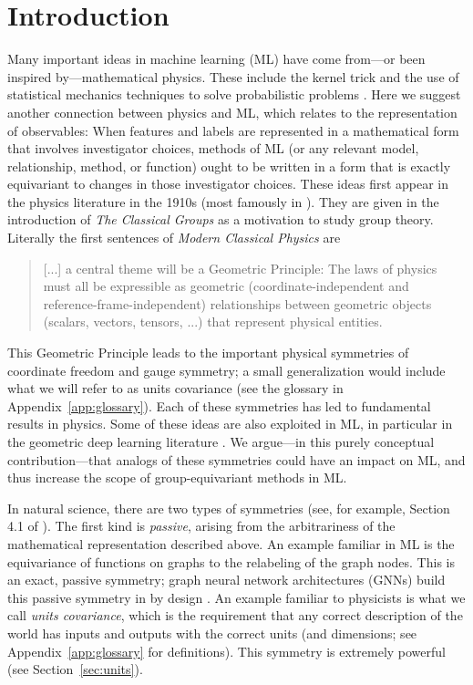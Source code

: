 \documentclass[]{article} %
\newcommand{\sectionname}{Section}
\newcommand{\secref}[1]{\sectionname~\ref{#1}}
\newcommand{\appref}[1]{Appendix~\ref{#1}}
\begin{document}
\section{Introduction}\label{sec:intro}
Many important ideas in machine learning (ML) have come from---or been inspired by---mathematical physics.
These include the kernel trick \citep{CouHil53,SchSmo02} and the use of statistical mechanics techniques to solve probabilistic problems \citep{mcmc, gibbs}.
Here we suggest another connection between physics and ML, which relates to the representation of observables:
When features and labels are represented in a mathematical form that involves investigator choices, methods of ML (or any relevant model, relationship, method, or function) ought to be written in a form that is exactly equivariant to changes in those investigator choices.
These ideas first appear in the physics literature in the 1910s (most famously in \citealt{gr}). They are given in the introduction of \textit{The Classical Groups} \citep{weyl} as a motivation to study group theory.
Literally the first sentences of \textit{Modern Classical Physics} \citep{mcp} are
\begin{quote}
[...] a central theme will be a Geometric Principle: 
The laws of physics must all
be expressible as geometric (coordinate-independent and reference-frame-independent)
relationships between geometric objects (scalars, vectors, tensors, ...) that represent
physical entities.
\end{quote}
This Geometric Principle leads to the important physical symmetries of coordinate freedom and gauge symmetry; a small generalization would include what we will refer to as units covariance (see the glossary in \appref{app:glossary}).
Each of these symmetries has led to fundamental results in physics. Some of these ideas are also exploited in ML, in particular in the geometric deep learning literature \citep{bronstein2021geometric, weiler}. 
We argue---in this purely conceptual contribution---that analogs of these symmetries could have an impact on ML, and thus increase the scope of group-equivariant methods in ML.

In natural science, there are two types of symmetries (see, for example, Section 4.1 of \citealt{rovelli2000loop}). 
The first kind is \emph{passive}, arising from the arbitrariness of the mathematical representation described above.
An example familiar in ML is the equivariance of functions on graphs to the relabeling of the graph nodes.
This is an exact, passive symmetry; graph neural network architectures (GNNs) build this passive symmetry in by design \citep{bruna2013spectral, duvenaud2015convolutional, gilmer2017neural, hamilton2020graph}. 
An example familiar to physicists is what we call \emph{units covariance}, which is the requirement that any correct description of the world has inputs and outputs with the correct units (and dimensions; see \appref{app:glossary} for definitions).
This symmetry is extremely powerful (see \secref{sec:units}).
\end{document}
